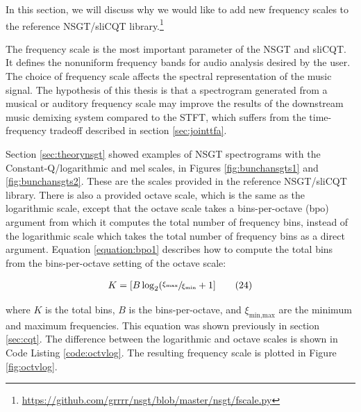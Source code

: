 \documentclass[report.tex]{subfiles}
\begin{document}
In this section, we will discuss why we would like to add new frequency scales to the reference NSGT/sliCQT library.\footnote{\url{https://github.com/grrrr/nsgt/blob/master/nsgt/fscale.py}}

The frequency scale is the most important parameter of the NSGT and sliCQT. It defines the nonuniform frequency bands for audio analysis desired by the user. The choice of frequency scale affects the spectral representation of the music signal. The hypothesis of this thesis is that a spectrogram generated from a musical or auditory frequency scale may improve the results of the downstream music demixing system compared to the STFT, which suffers from the time-frequency tradeoff described in section \ref{sec:jointtfa}.

Section \ref{sec:theorynsgt} showed examples of NSGT spectrograms with the Constant-Q/logarithmic and mel scales, in Figures \ref{fig:bunchansgts1} and \ref{fig:bunchansgts2}. These are the scales provided in the reference NSGT/sliCQT library. There is also a provided octave scale, which is the same as the logarithmic scale, except that the octave scale takes a bins-per-octave (bpo) argument from which it computes the total number of frequency bins, instead of the logarithmic scale which takes the total number of frequency bins as a direct argument. Equation \eqref{equation:bpo1} describes how to compute the total bins from the bins-per-octave setting of the octave scale:

\begin{align}
	K = [B \log_{2}(\sfrac{\xi_{\text{max}}}{\xi_{\text{min}}} + 1]\tag{24}\label{equation:bpo1}
\end{align}

where $K$ is the total bins, $B$ is the bins-per-octave, and $\xi_{\text{min,max}}$ are the minimum and maximum frequencies. This equation was shown previously in section \ref{sec:cqt}. The difference between the logarithmic and octave scales is shown in Code Listing \ref{code:octvlog}. The resulting frequency scale is plotted in Figure \ref{fig:octvlog}.
\end{document}
